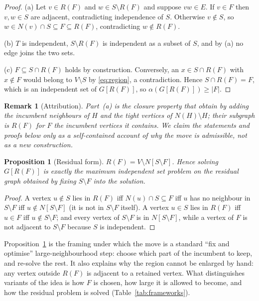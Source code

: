 \documentclass[pdflatex,sn-mathphys-num]{sn-jnl}
\theoremstyle{thmstyleone}%
\newtheorem{proposition}[theorem]{Proposition}%
\theoremstyle{thmstyletwo}%
\newtheorem{remark}{Remark}%
\begin{document}
\begin{proof}
(a) Let $v \in R(F)$ and $w \in S \setminus R(F)$ and suppose $vw \in E$. If
$v \in F$ then $v,w \in S$ are adjacent, contradicting independence of $S$.
Otherwise $v \notin S$, so $w \in N(v) \cap S \subseteq F \subseteq R(F)$,
contradicting $w \notin R(F)$.

(b) $T$ is independent, $S \setminus R(F)$ is independent as a subset of $S$,
and by (a) no edge joins the two sets.

(c) $F \subseteq S \cap R(F)$ holds by construction. Conversely, an
$x \in S \cap R(F)$ with $x \notin F$ would belong to $V \setminus S$ by
\eqref{eq:region}, a contradiction. Hence $S \cap R(F) = F$, which is an
independent set of $G[R(F)]$, so $\alpha(G[R(F)]) \ge |F|$.
\end{proof}

\begin{remark}[Attribution]
\label{rem:attr}
Part~(a) is the closure property that \citet{borowitz2025} obtain by adding the
incumbent neighbours of $H$ and the tight vertices of $N(H)\setminus H$; their
subgraph is $R(F)$ for $F$ the incumbent vertices it contains. We claim
the statements and proofs below only as a self-contained account of why the move
is admissible, not as a new construction.
\end{remark}

\begin{proposition}[Residual form]
\label{prop:residual}
$R(F) = V \setminus N[S \setminus F]$. Hence solving $G[R(F)]$ is exactly the
maximum independent set problem on the residual graph obtained by fixing
$S \setminus F$ into the solution.
\end{proposition}

\begin{proof}
A vertex $u \notin S$ lies in $R(F)$ iff $N(u)\cap S\subseteq F$ iff $u$ has no
neighbour in $S\setminus F$ iff $u \notin N[S\setminus F]$ (it is not in
$S \setminus F$ itself). A vertex $u\in S$ lies in $R(F)$ iff $u\in F$ iff
$u\notin S\setminus F$; and every vertex of $S \setminus F$ is in
$N[S\setminus F]$, while a vertex of $F$ is not adjacent to $S\setminus F$
because $S$ is independent.
\end{proof}

Proposition~\ref{prop:residual} is the framing under which the move is a
standard ``fix and optimise'' large-neighbourhood step: choose which part of the
incumbent to keep, and re-solve the rest. It also explains why the region cannot
be enlarged by hand: any vertex outside $R(F)$ is adjacent to a retained
vertex. What distinguishes variants of the idea is how $F$ is chosen, how large
it is allowed to become, and how the residual problem is solved
(Table~\ref{tab:frameworks}).
\end{document}
